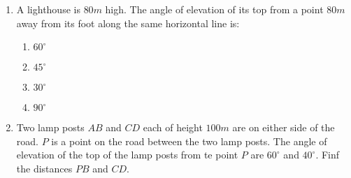 \documentclass{article}
\begin{document}
 \begin{enumerate}
	 \item A lighthouse is $80 m$ high. The angle of elevation of its top from a point $80 m$ away from its foot along the same horizontal line is:
		 \begin{enumerate}
			 \item $60^{\circ}$
			 \item $45^{\circ}$
			 \item $30^{\circ}$
			 \item $90^{\circ}$
		 \end{enumerate}
	 \item Two lamp posts $AB$ and $CD$ each of height $100 m$ are on either side of the road. $P$ is a point on the road between the two lamp posts. The angle of elevation of the top of the lamp posts from te point $P$ are $60^{\circ}$ and $40^{\circ}$. Finf the distances $PB$ and $CD$.
 \end{enumerate}  
 
\end{document}
